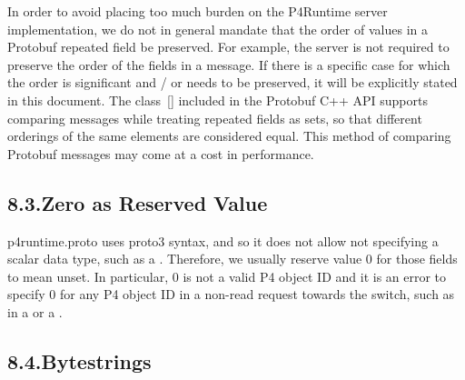 \documentclass[11pt]{article}
\begin{document}
{%
In order to avoid placing too much burden on the P4Runtime server
implementation, we do not in general mandate that the order of values in a
Protobuf repeated field be preserved. For example, the server is not required to
preserve the order of the  fields in a  message. If there is
a specific case for which the order is significant and / or needs to be
preserved, it will be explicitly stated in this document. The
 class~[] included in the Protobuf
C++ API supports comparing messages while treating repeated fields as sets, so
that different orderings of the same elements are considered equal. This method
of comparing Protobuf messages may come at a cost in performance.%

\subsection{8.3.\hspace*{0.5em}Zero as Reserved Value}\label{sec-zero-as-reserved-value}%

\noindent{}p4runtime.proto uses proto3 syntax, and so it does not allow not specifying a
scalar data type, such as a . Therefore, we usually reserve value 0 for
those fields to mean unset. In particular, 0 is not a valid P4 object ID and it
is an error to specify 0 for any P4 object ID in a non-read request towards the
switch, such as in a  or a .%

\subsection{8.4.\hspace*{0.5em}Bytestrings}\label{sec-bytestrings}%

}
\end{document}
